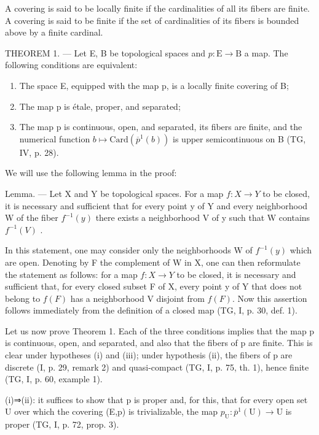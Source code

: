 A covering is said to be locally finite if the cardinalities of all its fibers are finite. A covering is said to be finite if the set of cardinalities of its fibers is bounded above by a finite cardinal.

THEOREM 1. --- Let E, B be topological spaces and \(p\colon\mathrm{E}\to\mathrm{B}\) a map. The following conditions are equivalent:

\begin{enumerate}
\def\labelenumi{(\roman{enumi})}
\item
  The space E, equipped with the map p, is a locally finite covering of B;
\item
  The map p is étale, proper, and separated;
\item
  The map p is continuous, open, and separated, its fibers are finite, and the numerical function \(b \mapsto \text{Card}(\overline{p}^{1}(b))\) is upper semicontinuous on B (TG, IV, p. 28).
\end{enumerate}

We will use the following lemma in the proof:

Lemma. — Let X and Y be topological spaces. For a map \(f: X \to Y\) to be closed, it is necessary and sufficient that for every point y of Y and every neighborhood W of the fiber \(f^{-1}(y)\) there exists a neighborhood V of y such that W contains \(f^{-1}(V)\) .

In this statement, one may consider only the neighborhoods W of \(f^{-1}(y)\) which are open. Denoting by F the complement of W in X, one can then reformulate the statement as follows: for a map \(f: X \to Y\) to be closed, it is necessary and sufficient that, for every closed subset F of X, every point y of Y that does not belong to \(f(F)\) has a neighborhood V disjoint from \(f(F)\). Now this assertion follows immediately from the definition of a closed map (TG, I, p. 30, def. 1).

Let us now prove Theorem 1. Each of the three conditions implies that the map p is continuous, open, and separated, and also that the fibers of p are finite. This is clear under hypotheses (i) and (iii); under hypothesis (ii), the fibers of p are discrete (I, p. 29, remark 2) and quasi-compact (TG, I, p. 75, th. 1), hence finite (TG, I, p. 60, example 1).

(i)⇒(ii): it suffices to show that p is proper and, for this, that for every open set U over which the covering (E,p) is trivializable, the map \(p_{\mathrm{U}}\colon \overline{p}^{1}(\mathrm{U})\to\mathrm{U}\) is proper (TG, I, p. 72, prop. 3).


